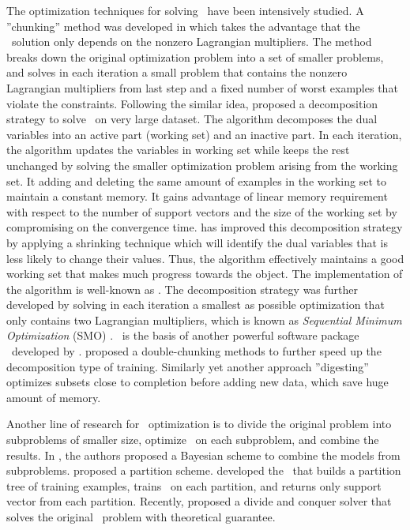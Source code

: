 The optimization techniques for solving \svm\ have been intensively studied.
A ''chunking'' method was developed in \citep{Vapnik82estimation} which takes the advantage that the \svm\ solution only depends on the nonzero Lagrangian multipliers.
The method breaks down the original optimization problem into a set of smaller problems, and solves in each iteration a small problem that contains the nonzero Lagrangian multipliers from last step and a fixed number of worst examples that violate the constraints.
Following the similar idea, \citet{Osuna97an} proposed a decomposition strategy to solve \svm\ on very large dataset.
The algorithm decomposes the dual variables into an active part (working set) and an inactive part.
In each iteration, the algorithm updates the variables in working set while keeps the rest unchanged by solving the smaller optimization problem arising from the working set.
It adding and deleting the same amount of examples in the working set to maintain a constant memory.
It gains advantage of linear memory requirement with respect to the number of support vectors and the size of the working set by compromising on the convergence time.
\citep{Joachims98making} has improved this decomposition strategy by applying a shrinking technique which will identify the dual variables that is less likely to change their values.
Thus, the algorithm effectively maintains a good working set that makes much progress towards the object.
The implementation of the algorithm is well-known as \svmlight.
The decomposition strategy was further developed by solving in each iteration a smallest as possible optimization that only contains two Lagrangian multipliers, which is known as \textit{Sequential Minimum Optimization} (SMO) \citep{Platt98sequential,Platt99fast}.
\smo\ is the basis of another powerful software package \libsvm\ developed by \citet{Chang11libsvm}.
\citet{Perezcruz04double} proposed a double-chunking methods to further speed up the decomposition type of training. 
Similarly yet another approach ''digesting'' \citep{Decoste02support} optimizes subsets close to completion before adding new data, which save huge amount of memory.

Another line of research for \svm\ optimization is to divide the original problem into subproblems of smaller size, optimize \svm\ on each subproblem, and combine the results.
In \citep{Schwaighofer01the,Tresp00a}, the authors proposed a Bayesian scheme to combine the models from subproblems.
\citet{Collobert02a} proposed a partition scheme.
\citet{Graf05parallel} developed the \svmcascade\ that builds a partition tree of training examples, trains \svm\ on each partition, and returns only support vector from each partition.
Recently, \citet{Hsieh13a} proposed a divide and conquer solver that solves the original \svm\ problem with theoretical guarantee.



